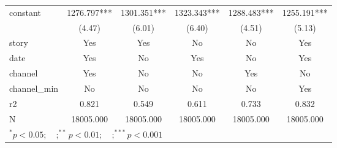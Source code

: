 \begin{tabular}{l*{5}{c}}
constant            &    1276.797***&    1301.351***&    1323.343***&    1288.483***&    1255.191***\\
                    &      (4.47)   &      (6.01)   &      (6.40)   &      (4.51)   &      (5.13)   \\
\midrule
story               &         Yes   &         Yes   &          No   &          No   &         Yes   \\
date                &         Yes   &          No   &         Yes   &          No   &         Yes   \\
channel             &         Yes   &          No   &          No   &         Yes   &          No   \\
channel\_min         &          No   &          No   &          No   &          No   &         Yes   \\
r2                  &       0.821   &       0.549   &       0.611   &       0.733   &       0.832   \\
N                   &   18005.000   &   18005.000   &   18005.000   &   18005.000   &   18005.000   \\
\bottomrule
\multicolumn{6}{l}{\footnotesize $^{*}p<0.05; \quad ; ^{**} p<0.01; \quad ; ^{***}p<0.001$}\\
\end{tabular}
